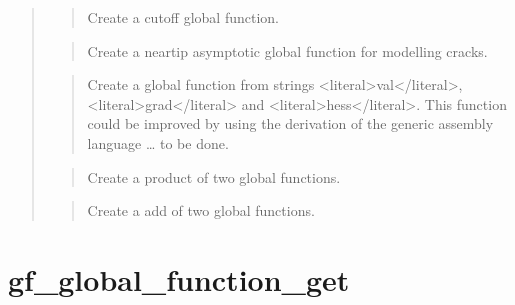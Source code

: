 \documentclass[a4paper,11pt,english]{sphinxmanual}
\begin{document}
\sphinxAtStartPar
{}
\begin{quote}

\sphinxAtStartPar
{}
\begin{quote}

\sphinxAtStartPar
Create a cutoff global function.
\end{quote}

\sphinxAtStartPar
{}
\begin{quote}

\sphinxAtStartPar
Create a near\sphinxhyphen{}tip asymptotic global function for modelling cracks.
\end{quote}

\sphinxAtStartPar
{}
\begin{quote}

\sphinxAtStartPar
Create a global function from strings \textless{}literal\textgreater{}val\textless{}/literal\textgreater{}, \textless{}literal\textgreater{}grad\textless{}/literal\textgreater{} and \textless{}literal\textgreater{}hess\textless{}/literal\textgreater{}.
This function could be improved by using the derivation of the generic
assembly language … to be done.
\end{quote}

\sphinxAtStartPar
{}
\begin{quote}

\sphinxAtStartPar
Create a product of two global functions.
\end{quote}

\sphinxAtStartPar
{}
\begin{quote}

\sphinxAtStartPar
Create a add of two global functions.
\end{quote}
\end{quote}


\section{gf\_global\_function\_get}
\label{\detokenize{scilab/cmdref_gf_global_function_get:gf-global-function-get}}\label{\detokenize{scilab/cmdref_gf_global_function_get::doc}}
\sphinxAtStartPar
{}
\end{document}
